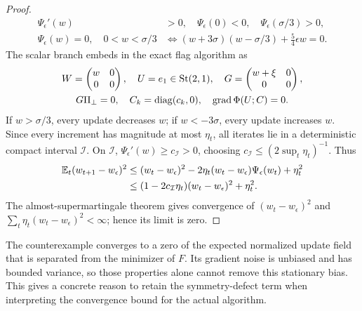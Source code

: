 \begin{proof}
\begin{align}
 \Psi_\epsilon'(w)&>0,\quad\Psi_\epsilon(0)<0,\quad
                                 \Psi_\epsilon(\sigma/3)>0,\\
 \Psi_\epsilon(w)=0,\quad0<w<\sigma/3
 &\Longleftrightarrow
 (w+3\sigma)(w-\sigma/3)+\tfrac54\epsilon w=0.
\end{align}
The scalar branch embeds in the exact flag algorithm as
\begin{gather}
 W=\begin{pmatrix}w&0\\0&0\end{pmatrix},\quad U=e_1\in\operatorname{St}(2,1),\quad
 G=\begin{pmatrix}w+\xi&0\\0&0\end{pmatrix},\\
 G\Pi_\perp=0,\quad C_k=\operatorname{diag}(c_k,0),\quad
 \operatorname{grad}\Phi(U;C)=0.
\end{gather}
If $w>\sigma/3$, every update decreases $w$; if $w<-3\sigma$, every update
increases $w$. Since every increment has magnitude at most $\eta_t$, all iterates
lie in a deterministic compact interval $\mathcal I$. On $\mathcal I$,
$\Psi_\epsilon'(w)\ge c_\mathcal I>0$, choosing
$c_\mathcal I\le(2\sup_t\eta_t)^{-1}$. Thus
\begin{align}
 \mathbb E_t(w_{t+1}-w_\epsilon)^2
 &\le(w_t-w_\epsilon)^2-2\eta_t(w_t-w_\epsilon)\Psi_\epsilon(w_t)+\eta_t^2\\
 &\le(1-2c_\mathcal I\eta_t)(w_t-w_\epsilon)^2+\eta_t^2.
\end{align}
The almost-supermartingale theorem gives convergence of $(w_t-w_\epsilon)^2$
and $\sum_t\eta_t(w_t-w_\epsilon)^2<\infty$; hence its limit is zero.
\end{proof}
The counterexample converges to a zero of the expected normalized update field
that is separated from the minimizer of $F$. Its gradient noise is unbiased
and has bounded variance, so those properties alone cannot remove this
stationary bias. This gives a concrete reason to retain the symmetry-defect
term when interpreting the convergence bound for the actual algorithm.

